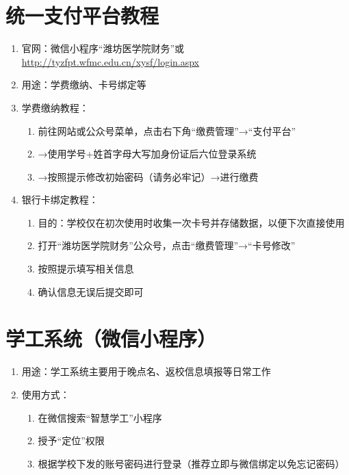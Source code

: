 \section[统一支付平台教程]{统一支付平台教程}
\label{fee_pay}
\begin{enumerate}
    \item 官网：微信小程序“潍坊医学院财务”或\uline{\href{http://tyzfpt.wfmc.edu.cn/xysf/login.aspx}{http://tyzfpt.wfmc.edu.cn/xysf/login.aspx}}
    \item 用途：学费缴纳、卡号绑定等
    \item 学费缴纳教程：
          \begin{enumerate}
              \item 前往网站或公众号菜单，点击右下角“缴费管理”→“支付平台”
              \item →使用学号+姓首字母大写加身份证后六位登录系统
              \item →按照提示修改初始密码（请务必牢记）→进行缴费
          \end{enumerate}
    \item 银行卡绑定教程：
          \begin{enumerate}
              \item 目的：学校仅在初次使用时收集一次卡号并存储数据，以便下次直接使用\footnotemark
              \item 打开“潍坊医学院财务”公众号，点击“缴费管理”→“卡号修改”
              \item 按照提示填写相关信息
              \item 确认信息无误后提交即可
          \end{enumerate}
\end{enumerate}

\section[学工系统（微信小程序）]{学工系统（微信小程序）}
\begin{enumerate}
    \item 用途：学工系统主要用于晚点名、返校信息填报等日常工作\footnotemark
    \item 使用方式：
          \begin{enumerate}
              \item 在微信搜索“智慧学工”小程序
              \item 授予“定位”权限
              \item 根据学校下发的账号密码进行登录（推荐立即与微信绑定以免忘记密码）
          \end{enumerate}
\end{enumerate}

